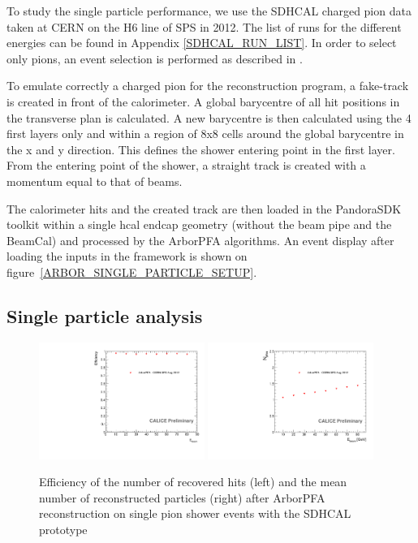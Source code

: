 \documentclass[cits]{JINST}
\begin{document}
To study the single particle performance, we use the SDHCAL charged pion data taken at CERN on the H6 line of SPS in 2012. The list of runs for the different energies can be found in Appendix \ref{SDHCAL_RUN_LIST}. In order to select only pions, an event selection is performed as described in \cite{sdhcal-paper}.

To emulate correctly a charged pion for the reconstruction program, a fake-track is created in front of the calorimeter. A global barycentre of all hit positions in the transverse plan is calculated. A new barycentre is then calculated using the 4 first layers only and within a region of 8x8 cells around the global barycentre in the x and y direction. This defines the shower entering point in the first layer. From the entering point of the shower, a straight track is created with a momentum equal to that of beams.

The calorimeter hits and the created track are then loaded in the PandoraSDK toolkit \cite{pandora-sdk} within a single hcal endcap geometry (without the beam pipe and the BeamCal) and processed by the ArborPFA algorithms. An event display after loading the inputs in the framework is shown on figure~\ref{ARBOR_SINGLE_PARTICLE_SETUP}.

\subsection{Single particle analysis}

\begin{figure}[!h]
  \begin{center}
    \includegraphics[width=0.48\textwidth]{plots/SingleParticle_Efficiency.pdf}
    \includegraphics[width=0.48\textwidth]{plots/SingleParticle_NPfos.pdf} \\
  \end{center}
  \caption{\label{ARBOR_SINGLE_PARTICLE_EFFICIENCY_AND_NPFOS} Efficiency of the number of recovered hits (left) and the mean number of reconstructed particles (right) after ArborPFA reconstruction on single pion shower events with the SDHCAL prototype}
\end{figure}
\end{document}
